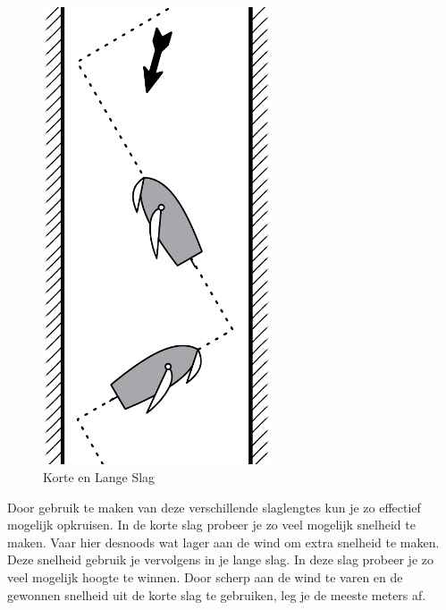 \begin{figure}[h]
\begin{minipage}{0.40\textwidth}
		\includegraphics[width=0.6\textwidth]{Hoofdstukken/Onderdelen/pdf/korte_lange_Slag.pdf}
		\caption{Korte en Lange Slag}
		\label{pic:kort_lang}
	\end{minipage}
\end{figure}

\newpage

Door gebruik te maken van deze verschillende slaglengtes kun je zo effectief mogelijk opkruisen. In de korte slag probeer je zo veel mogelijk snelheid te maken. Vaar hier desnoods wat lager aan de wind om extra snelheid te maken. Deze snelheid gebruik je vervolgens in je lange slag. In deze slag probeer je zo veel mogelijk hoogte te winnen. Door scherp aan de wind te varen en de gewonnen snelheid uit de korte slag te gebruiken, leg je de meeste meters af.

